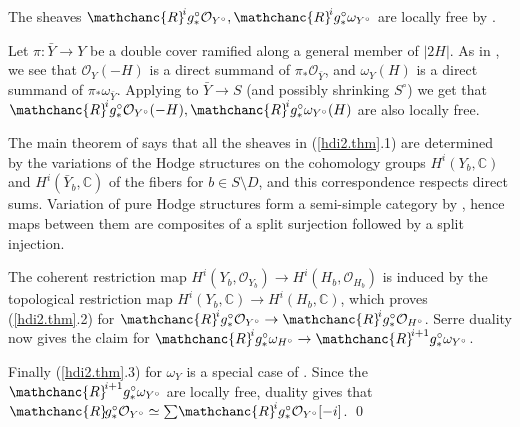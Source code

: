 \documentclass{amsart}
\theoremstyle{definition}
\theoremstyle{remark}
\renewcommand{\c}[0]{{\mathbb C}}
\renewcommand{\o}[0]{{\mathcal O}}
\newcommand{\tsum}[0]{\textstyle{\sum}}
\newcommand{\myR}{{\mathchanc{R}\!}}
\begin{document}
 The  sheaves
  $\myR^ig^\circ_*\o_{Y^\circ}, 
 \myR^ig^\circ_*\omega_{Y^\circ}$ are locally free by
 \cite[2.6]{k-hdi2}.

 Let $\pi:\bar Y\to Y$ be a double cover ramified along a general member of $|2H|$.
 As in \cite[2.44]{kk-singbook}, we see that
 $\o_Y(-H)$ is a direct summand of
 $\pi_*\o_{\bar Y}$, and
  $\omega_Y(H)$ is a direct summand of
 $\pi_*\omega_{\bar Y}$. Applying  \cite[2.6]{k-hdi2}
 to $\bar Y\to S$ (and possibly shrinking $S^\circ$)
 we get that $\myR^ig^\circ_*\o_{Y^\circ}(-H), 
 \myR^ig^\circ_*\omega_{Y^\circ}(H)$ are also locally free.


   
 
 The main theorem of \cite[p.174]{k-hdi2} says that all the sheaves
 in (\ref{hdi2.thm}.1) are determined by the variations of the Hodge structures on the cohomology groups   $H^i(Y_b, \c)$ and $H^i(\bar Y_b, \c)$ of the fibers  for 
 $b\in S \setminus D$,
 and this correspondence respects direct sums.
Variation of pure Hodge structures form a semi-simple category by \cite{MR0498551}, hence maps between them 
are composites of a split surjection followed by a split injection.

The coherent restriction map $H^i(Y_b, \o_{Y_b})\to H^i(H_b, \o_{H_b})$ is induced by the topological restriction map $H^i(Y_b, \c)\to H^i(H_b, \c)$, which proves 
(\ref{hdi2.thm}.2) for 
$\myR^ig^\circ_*\o_{Y^\circ}\to \myR^ig^\circ_*\o_{H^\circ}$.
Serre duality now gives the claim for
$ \myR^ig^\circ_*\omega_{H^\circ}\to
 \myR^{i+1}g^\circ_*\omega_{Y^\circ}$.


 Finally (\ref{hdi2.thm}.3) for $\omega_Y$ is a special case of
 \cite[3.1]{k-hdi2}. Since  the $\myR^{i+1}g^\circ_*\omega_{Y^\circ}$ are locally free, duality gives that
$\myR g^\circ_*\o_{Y^\circ}\simeq \tsum\myR^ig^\circ
   _*\o_{Y^\circ}[-i]$. 
 \qed
\end{document}
